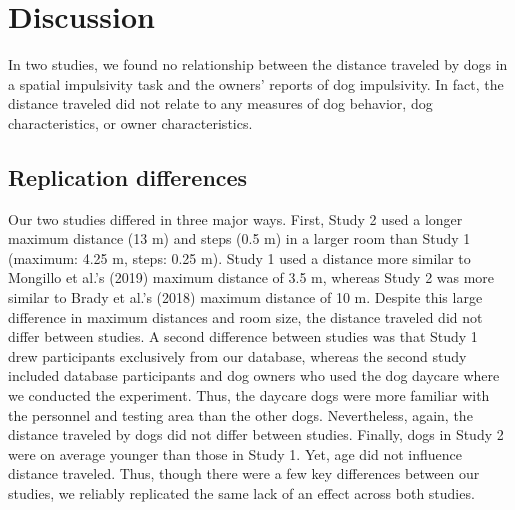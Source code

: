 \documentclass[
  pub,floatsintext]{apa6}
\begin{document}
\hypertarget{discussion}{%
\section{Discussion}\label{discussion}}

In two studies, we found no relationship between the distance traveled by dogs in a spatial impulsivity task and the owners' reports of dog impulsivity. In fact, the distance traveled did not relate to any measures of dog behavior, dog characteristics, or owner characteristics.

\hypertarget{replication-differences}{%
\subsection{Replication differences}\label{replication-differences}}

Our two studies differed in three major ways. First, Study 2 used a longer maximum distance (13 m) and steps (0.5 m) in a larger room than Study 1 (maximum: 4.25 m, steps: 0.25 m). Study 1 used a distance more similar to Mongillo et al.'s (2019) maximum distance of 3.5 m, whereas Study 2 was more similar to Brady et al.'s (2018) maximum distance of 10 m. Despite this large difference in maximum distances and room size, the distance traveled did not differ between studies. A second difference between studies was that Study 1 drew participants exclusively from our database, whereas the second study included database participants and dog owners who used the dog daycare where we conducted the experiment. Thus, the daycare dogs were more familiar with the personnel and testing area than the other dogs. Nevertheless, again, the distance traveled by dogs did not differ between studies. Finally, dogs in Study 2 were on average younger than those in Study 1. Yet, age did not influence distance traveled. Thus, though there were a few key differences between our studies, we reliably replicated the same lack of an effect across both studies.
\end{document}

